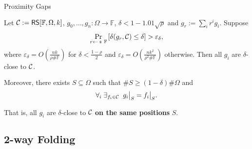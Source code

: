 \documentclass{zkdl-presentation-template}
\begin{document}
    \begin{frame}{Proximity Gaps}
        \begin{lemma}
            Let $\mathcal{C} := \mathsf{RS}[\mathbb{F},\Omega,k]$, $g_0,\dots,g_n: \Omega \to \mathbb{F}$, $\delta < 1-1.01\sqrt{\rho}$ and $g_r := \sum_{i} r^ig_i$. Suppose
            \begin{equation*}
                \Pr_{r \leftarrowS \mathbb{F}}\left[\delta(g_r, \code) \leq \delta\right] > \varepsilon_{\delta},
            \end{equation*}
            where $\varepsilon_{\delta} = O(\frac{nk}{\rho\#\mathbb{F}})$ for $\delta<\frac{1-\rho}{2}$ and $\varepsilon_{\delta} = O(\frac{nk^2}{\rho^2\#\mathbb{F}})$ otherwise. Then all $g_i$ are $\delta$-close to $\mathcal{C}$.
        \end{lemma}
        \pause

        \begin{theorem}[BCIKS20]
            Moreover, there exists $S \subseteq \Omega$ such that $\#S \geq (1-\delta)\#\Omega$ and
            \begin{equation*}
                \forall_{i} \; \exists_{f_i \in \mathcal{C}} \;\; g_i\big|_S = f_i\big|_S.
            \end{equation*}
        \end{theorem}
        \pause
        That is, all $g_i$ are $\delta$-close to $\mathcal{C}$ \textbf{on the same positions} $S$.
    \end{frame}

    \subsection{2-way Folding}
\end{document}
